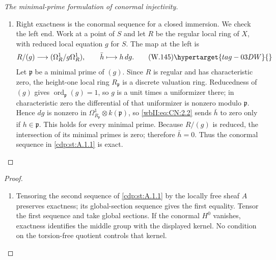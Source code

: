\begin{proof}[The minimal-prime formulation of conormal injectivity]
\begin{enumerate}[label={$\langle1\rangle$\arabic*.},leftmargin=*]
\item 
Right exactness is the conormal sequence for a closed immersion.  We check
the left end.  Work at a point of $S$ and let $R$ be the regular local ring
of $X$, with reduced local equation $g$ for $S$.  The map at the left is
\[
 R/(g)\longrightarrow (\Omega^1_R/g\Omega^1_R),
 \qquad \bar h\longmapsto h\,dg.
 \tag{W.145}\hypertarget{tag-03DW}{}\label{wbII:eq:CN:2.2}
\]
Let $\mathfrak p$ be a minimal prime of $(g)$.  Since $R$ is regular and
has characteristic zero, the height-one local ring $R_{\mathfrak p}$ is a
discrete valuation ring.  Reducedness of $(g)$ gives
$\operatorname{ord}_{\mathfrak p}(g)=1$, so $g$ is a unit times a
uniformizer there; in characteristic zero the differential of that
uniformizer is nonzero modulo $\mathfrak p$.  Hence $dg$ is nonzero in
$\Omega^1_{R_{\mathfrak p}}\otimes k(\mathfrak p)$, so \eqref{wbII:eq:CN:2.2} sends $\bar h$
to zero only if $h\in\mathfrak p$.  This holds for every minimal prime.
Because $R/(g)$ is reduced, the intersection of its minimal primes is zero;
therefore $\bar h=0$.  Thus the conormal sequence in \cref{cdp:st:A.1.1} is exact.

\end{enumerate}
\end{proof}

\begin{proof}
\begin{enumerate}[label={$\langle1\rangle$\arabic*.},leftmargin=*]
\item 
Tensoring the second sequence of
\cref{cdp:st:A.1.1} by the locally free sheaf $A$
preserves exactness; its global-section sequence gives the first equality.
Tensor the first sequence and take global sections.  If the conormal
$H^0$ vanishes, exactness identifies the middle group with the displayed
kernel.  No condition on the torsion-free quotient controls that kernel.

\end{enumerate}
\end{proof}

